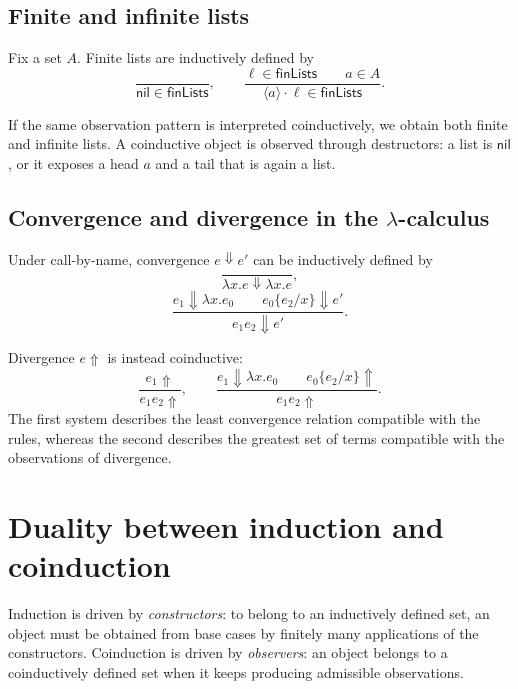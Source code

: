 \documentclass[a4paper]{article}
\newcommand{\nil}{\mathsf{nil}}
\begin{document}
\subsection{Finite and infinite lists}

Fix a set \(A\). Finite lists are inductively defined by
\[
    \frac{}{\nil\in\mathsf{finLists}},
    \qquad
    \frac{\ell\in\mathsf{finLists}\qquad a\in A}
    {\langle a\rangle\cdot\ell\in\mathsf{finLists}}.
\]

If the same observation pattern is interpreted coinductively, we obtain both finite and infinite lists.
A coinductive object is observed through destructors: a list is \(\nil\), or it exposes a head \(a\) and a tail that is again a list.

\subsection{Convergence and divergence in the \(\lambda\)-calculus}

Under call-by-name, convergence \(e\Downarrow e'\) can be inductively defined by
\[
    \frac{}{\lambda x.e\Downarrow\lambda x.e},
\]
\[
    \frac{
        e_1\Downarrow\lambda x.e_0
        \qquad
        e_0\{e_2/x\}\Downarrow e'
    }{
        e_1e_2\Downarrow e'
    }.
\]

Divergence \(e\Uparrow\) is instead coinductive:
\[
    \frac{e_1\Uparrow}{e_1e_2\Uparrow},
    \qquad
    \frac{
        e_1\Downarrow\lambda x.e_0
        \qquad
        e_0\{e_2/x\}\Uparrow
    }{
        e_1e_2\Uparrow}.
\]
The first system describes the least convergence relation compatible with the rules, whereas the second describes the greatest set of terms compatible with the observations of divergence.

\section{Duality between induction and coinduction}

Induction is driven by \emph{constructors}: to belong to an inductively defined set, an object must be obtained from base cases by finitely many applications of the constructors.
Coinduction is driven by \emph{observers}: an object belongs to a coinductively defined set when it keeps producing admissible observations.
\end{document}
